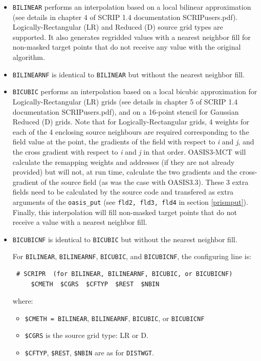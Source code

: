 \begin{itemize}
  \item {\tt BILINEAR} performs an interpolation based on a local
    bilinear approximation (see details in chapter 4 of SCRIP 1.4
    documentation SCRIPusers.pdf). Logically-Rectangular (LR) and
    Reduced (D) source grid types are supported.  It also generates
    regridded values with a nearest neighbor fill for non-masked
    target points that do not receive any value with the original algorithm.

  \item {\tt BILINEARNF} is identical to {\tt BILINEAR} but without the
    nearest neighbor fill.

  \item {\tt BICUBIC} performs an interpolation based on a local
    bicubic approximation for Logically-Rectangular (LR) grids (see
    details in chapter 5 of SCRIP 1.4 documentation SCRIPusers.pdf),
    and on a 16-point stencil for Gaussian Reduced (D) grids.  Note
    that for Logically-Rectangular grids, 4 weights for each of the 4
    enclosing source neighbours are required corresponding to the
    field value at the point, the gradients of the field with respect
    to {\it i} and {\it j}, and
    the cross gradient with respect to {\it i} and {\it j} in that
    order. OASIS3-MCT will calculate the remapping weights and
    addresses (if they are not already provided) but will not, at run
    time, calculate the two gradients and the cross-gradient of the
    source field (as was the case with OASIS3.3). These 3 extra fields
    need to be calculated by the source code and transfered as extra
    arguments of the {\tt oasis\_put} (see {\tt fld2, fld3, fld4} in
    section \ref{prismput}).  Finally, this interpolation will fill
    non-masked target points that do not receive a value with a nearest neighbor fill.

  \item {\tt BICUBICNF} is identical to {\tt BICUBIC} but without the
    nearest neighbor fill.
 
    For {\tt BILINEAR}, {\tt BILINEARNF}, {\tt BICUBIC}, and {\tt BICUBICNF}, the configuring line
    is:

  \begin{verbatim}
 # SCRIPR  (for BILINEAR, BILINEARNF, BICUBIC, or BICUBICNF)
     $CMETH  $CGRS  $CFTYP  $REST  $NBIN
\end{verbatim}
    \vspace{-0.5cm} where:
    \begin{itemize}
    \item {\tt \$CMETH = BILINEAR}, {\tt BILINEARNF}, {\tt BICUBIC}, or {\tt BICUBICNF}
    \item {\tt \$CGRS} is the source grid type: LR or D.
    \item {\tt \$CFTYP}, {\tt \$REST}, {\tt \$NBIN} are as for {\tt DISTWGT}.
    \end{itemize}
    

\end{itemize}

